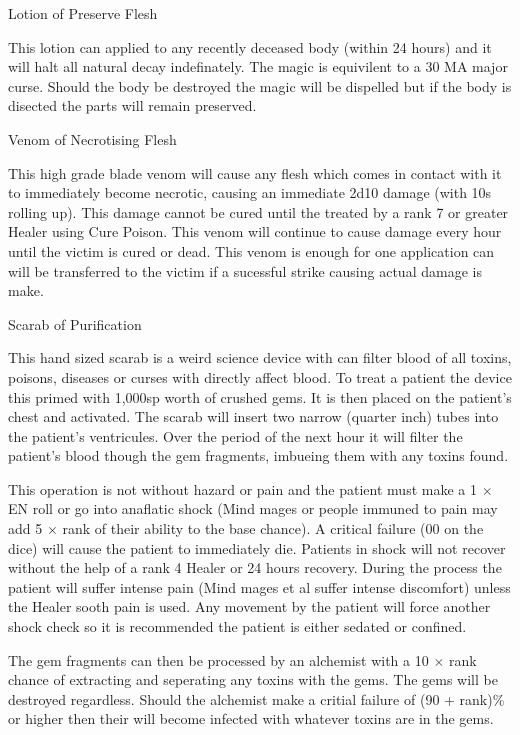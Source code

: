 \documentclass[a4paper]{article}
\begin{document}
\begin{ep-box}{Lotion of Preserve Flesh}

This lotion can applied to any recently deceased body (within 24 hours)
and it will halt all natural decay indefinately.  The magic is
equivilent to a 30 MA major curse.  Should the body be destroyed the
magic will be dispelled but if the body is disected the parts will
remain preserved.
\end{ep-box}



\begin{ep-box}{Venom of Necrotising Flesh}

This high grade blade venom will cause any flesh which comes in
contact with it to immediately become necrotic, causing an immediate
2d10 damage (with 10s rolling up).  This damage cannot be cured until
the treated by a rank 7 or greater Healer using Cure Poison.  This
venom will continue to cause damage every hour until the victim is 
cured or dead.  This venom is enough for one application can will
be transferred to the victim if a sucessful strike causing actual
damage is make.
\end{ep-box}



\begin{ep-box}{Scarab of Purification}

This hand sized scarab is a weird science device with can filter blood
of all toxins, poisons, diseases or curses with directly affect blood.
To treat a patient the device this primed with 1,000sp worth of
crushed gems.  It is then placed on the patient's chest and activated.
The scarab will insert two narrow (quarter inch) tubes into the
patient's ventricules.  Over the period of the next hour it will
filter the patient's blood though the gem fragments, imbueing them
with any toxins found.

This operation is not without hazard or pain and the patient must make
a 1 $\times$ EN roll or go into anaflatic shock (Mind mages or people
immuned to pain may add 5 $\times$ rank of their ability to the base
chance).  A critical failure (00 on the dice) will cause the patient
to immediately die.  Patients in shock will not recover without the
help of a rank 4 Healer or 24 hours recovery.  During the process the
patient will suffer intense pain (Mind mages et al suffer intense
discomfort) unless the Healer sooth pain is used.  Any movement by the
patient will force another shock check so it is recommended the
patient is either sedated or confined.

The gem fragments can then be processed by an alchemist with a 10
$\times$ rank chance of extracting and seperating any toxins with the
gems.  The gems will be destroyed regardless.  Should the alchemist
make a critial failure of (90 + rank)\% or higher then their will
become infected with whatever toxins are in the gems.
\end{ep-box}
\end{document}
